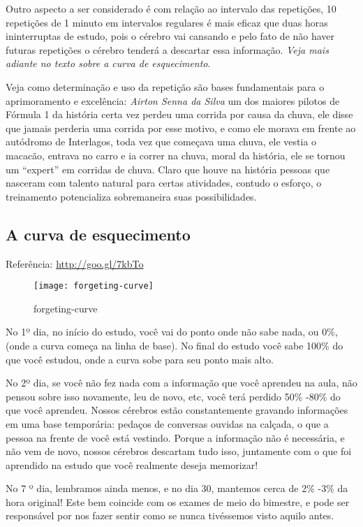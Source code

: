 Outro aspecto a ser considerado é com relação ao intervalo das
repetições, 10 repetições de 1 minuto em intervalos regulares é mais
eficaz que duas horas ininterruptas de estudo, pois o cérebro vai
cansando e pelo fato de não haver futuras repetições o cérebro tenderá
a descartar essa informação. \emph{Veja mais adiante no texto sobre a
curva de esquecimento}.

Veja como determinação e uso da repetição são bases fundamentais para
o aprimoramento e excelência:  {\em Airton Senna da Silva}
um dos maiores pilotos de Fórmula
1 da história certa vez perdeu uma corrida por causa da chuva, ele disse que
jamais perderia uma corrida por esse motivo, e como ele morava em frente ao
autódromo de Interlagos, toda vez que começava uma chuva, ele vestia
o macacão, entrava no carro e ia correr na chuva, moral da história, ele se
tornou um ``expert'' em corridas de chuva. Claro que houve na história
pessoas que nasceram com talento natural para certas atividades, contudo
o esforço, o treinamento potencializa sobremaneira suas possibilidades.

\subsection{A curva de esquecimento}
\label{sub:a_curva_de_esquecimento}
Referência: \href{http://goo.gl/7kbTo}{http://goo.gl/7kbTo}

\begin{figure}[h!]
	\centering
	\texttt{[image: forgeting-curve]}
	\caption{forgeting-curve}
\end{figure}

No 1º dia, no início do estudo, você vai do ponto onde não sabe nada, ou 0\%, (onde a
curva começa na linha de base). No final do estudo você sabe 100\% do
que você estudou, onde a curva sobe para seu ponto mais alto.

No 2º dia, se você não fez nada com a informação que você aprendeu na
aula, não pensou sobre isso novamente, leu de novo, etc, você terá
perdido 50\% -80\% do que você aprendeu. Nossos cérebros estão
constantemente gravando informações em uma base temporária: pedaços de
conversas ouvidas na calçada, o que a pessoa na frente de você está
vestindo. Porque a informação não é necessária, e não vem de novo,
nossos cérebros descartam tudo isso, juntamente com o que foi aprendido
na estudo que você realmente deseja memorizar!

No 7 º dia, lembramos ainda menos, e no dia 30, mantemos cerca de 2\%
-3\% da hora original! Este bem coincide com os exames de meio do
bimestre, e pode ser responsável por nos fazer sentir como se nunca
tivéssemos visto aquilo antes.



